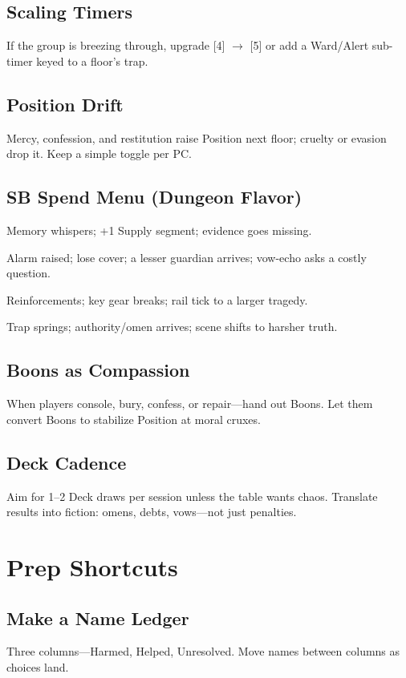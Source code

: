 \documentclass[18pt, letterpaper, twoside]{article}
\newcommand{\sbitem}[2]{\item[#1 SB:] #2}
\begin{document}
\begin{enumerate}
\subsection{Scaling Timers}
If the group is breezing through, upgrade [4] $\rightarrow$ [5] or add a Ward/Alert sub-timer keyed to a floor's trap.

\subsection{Position Drift}
Mercy, confession, and restitution raise Position next floor; cruelty or evasion drop it. Keep a simple toggle per PC.

\subsection{SB Spend Menu (Dungeon Flavor)}
\begin{description}[leftmargin=*, style=unboxed]
    \sbitem{1}{Memory whispers; +1 Supply segment; evidence goes missing.}
    \sbitem{2}{Alarm raised; lose cover; a lesser guardian arrives; vow-echo asks a costly question.}
    \sbitem{3}{Reinforcements; key gear breaks; rail tick to a larger tragedy.}
    \sbitem{4+}{Trap springs; authority/omen arrives; scene shifts to harsher truth.}
\end{description}

\subsection{Boons as Compassion}
When players console, bury, confess, or repair---hand out Boons. Let them convert Boons to stabilize Position at moral cruxes.

\subsection{Deck Cadence}
Aim for 1--2 Deck draws per session unless the table wants chaos. Translate results into fiction: omens, debts, vows---not just penalties.

\section{Prep Shortcuts}
\subsection{Make a Name Ledger}
Three columns---Harmed, Helped, Unresolved. Move names between columns as choices land.


\end{enumerate}
\end{document}
